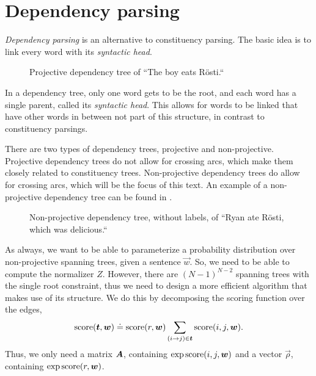 \section{Dependency parsing}

\textit{Dependency parsing} is an alternative to constituency parsing. The
basic idea is to link every word with its \textit{syntactic head}.

\begin{figure}[h!]
    \centering
    \caption{Projective dependency tree of ``The boy eats Rösti.``}
    \label{fig:dependency-parse}
\end{figure}

In a dependency tree, only one word gets to be the root, and each word has a
single parent, called its \textit{syntactic head}. This allows for words to be
linked that have other words in between not part of this structure, in contrast
to constituency parsings.

There are two types of dependency trees, projective and non-projective.
Projective dependency trees do not allow for crossing arcs, which make them
closely related to constituency trees. Non-projective dependency trees do allow
for crossing arcs, which will be the focus of this text. An example of a
non-projective dependency tree can be found in
.

\begin{figure}[ht]
    \centering
    \caption{Non-projective dependency tree, without labels, of ``Ryan ate
    Rösti, which was delicious.``}
    \label{fig:non-projective-dependency-tree}
\end{figure}

As always, we want to be able to parameterize a probability distribution over
non-projective spanning trees, given a sentence $\vec{w}$. So, we need to be
able to compute the normalizer $Z$. However, there are $(N-1)^{N-2}$ spanning
trees with the single root constraint, thus we need to design a more efficient
algorithm that makes use of its structure. We do this by decomposing the
scoring function over the edges, \[
  \mathrm{score}(\bm{t},\bm{w}) \doteq \mathrm{score}(r,\bm{w}) \sum_{(i\to j)\in\bm{t}} \mathrm{score}(i,j,\bm{w})
.\]
Thus, we only need a matrix $\bm{A}$, containing $\exp \mathrm{score}(i,j,\bm{w})$ and a
vector $\vec{\rho}$, containing $\exp \mathrm{score}(r,\bm{w})$.

